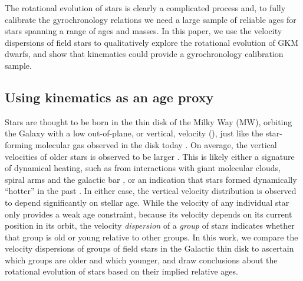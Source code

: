 The rotational evolution of stars is clearly a complicated process and, to
fully calibrate the gyrochronology relations we need a large sample of
reliable ages for stars spanning a range of ages and masses.
In this paper, we use the velocity dispersions of field stars to qualitatively
explore the rotational evolution of GKM dwarfs, and show that kinematics could
provide a gyrochronology calibration sample.

\subsection{Using kinematics as an age proxy}

Stars are thought to be born in the thin disk of the Milky Way (MW), orbiting
the Galaxy with a low out-of-plane, or vertical, velocity (\vz),
just like the star-forming molecular gas observed in the disk today
\citep[\eg][]{stark1989, stark2005, aumer2009, martig2014, aumer2016}.
On average, the vertical velocities of older stars is observed to be larger
\citep[\eg][]{nordstrom2004, holmberg2007, holmberg2009, aumer2009,
casagrande2011}.
This is likely either a signature of dynamical heating, such as from
interactions with giant molecular clouds, spiral arms and the galactic bar
\citep[see][for a review of secular evolution in the MW]{sellwood2014}, or an
indication that stars formed dynamically ``hotter'' in the past
\citep[e.g.,][]{bird2013}.
In either case, the vertical velocity distribution is observed to depend
significantly on stellar age.
While the velocity of any individual star only provides a weak age constraint,
because its velocity depends on its current position in its orbit, the
velocity {\it dispersion} of a {\it group} of stars indicates whether that
group is old or young relative to other groups.
In this work, we compare the velocity dispersions of groups of field stars in
the Galactic thin disk to ascertain which groups are older and which younger,
and draw conclusions about the rotational evolution of stars based on their
implied relative ages.

